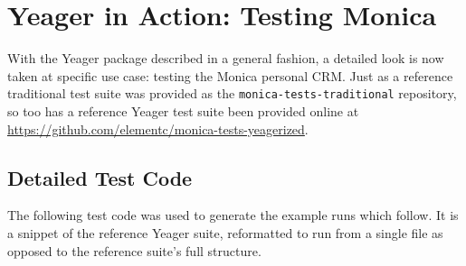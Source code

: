 \section{Yeager in Action: Testing Monica}
With the Yeager package described in a general fashion, a detailed look is now taken at specific use case: testing the Monica personal CRM. Just as a reference traditional test suite was provided as the \texttt{monica-tests-traditional} repository, so too has a reference Yeager test suite been provided online at \url{https://github.com/elementc/monica-tests-yeagerized}.

\subsection{Detailed Test Code}

The following test code was used to generate the example runs which follow. It is a snippet of the reference Yeager suite, reformatted to run from a single file as opposed to the reference suite's full structure.

